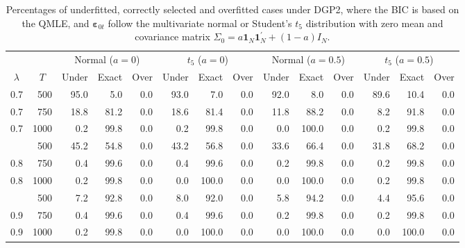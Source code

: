 \begin{table}[htbp]
	\centering
	\caption{\label{tab_BIC} Percentages of underfitted, correctly selected and overfitted cases under DGP2, where the BIC is based on the QMLE, and $\bm \varepsilon_{0t}$ follow the multivariate normal or Student's $t_5$ distribution with zero mean and covariance matrix $\Sigma_0 =   a \bm 1_N \bm 1_N^\prime + (1-a)I_N $. }
		\renewcommand{\arraystretch}{1.1}
	\begin{adjustbox}{width=\textwidth}
		\begin{tabular}{rrrrrrrrrrrrrr}
			\toprule
			&       & \multicolumn{3}{c}{Normal ($a=0$)} & \multicolumn{3}{c}{$t_5$ ($a=0$)} & \multicolumn{3}{c}{Normal ($a=0.5$)} & \multicolumn{3}{c}{$t_5$ ($a=0.5$)} \\
			\cmidrule(lr){3-5} \cmidrule(lr){6-8} \cmidrule(lr){9-11} \cmidrule(lr){12-14}
		\multicolumn{1}{c}{$\lambda$}	&  \multicolumn{1}{c}{$T$}  & \multicolumn{1}{l}{Under} & \multicolumn{1}{l}{Exact} & \multicolumn{1}{l}{Over} & \multicolumn{1}{l}{Under} & \multicolumn{1}{l}{Exact} & \multicolumn{1}{l}{Over} & \multicolumn{1}{l}{Under} & \multicolumn{1}{l}{Exact} & \multicolumn{1}{l}{Over} & \multicolumn{1}{l}{Under} & \multicolumn{1}{l}{Exact} & \multicolumn{1}{l}{Over} \\
			\midrule
0.7 & 500 & 95.0 & 5.0 & 0.0 & 93.0 & 7.0 & 0.0 & 92.0 & 8.0 & 0.0 & 89.6 & 10.4 & 0.0 \\
0.7 & 750 & 18.8 & 81.2 & 0.0 & 18.6 & 81.4 & 0.0 & 11.8 & 88.2 & 0.0 & 8.2 & 91.8 & 0.0 \\
0.7 & 1000 & 0.2 & 99.8 & 0.0 & 0.2 & 99.8 & 0.0 & 0.0 & 100.0 & 0.0 & 0.2 & 99.8 & 0.0 \\
\addlinespace[3pt]
0.8 & 500 & 45.2 & 54.8 & 0.0 & 43.2 & 56.8 & 0.0 & 33.6 & 66.4 & 0.0 & 31.8 & 68.2 & 0.0 \\
0.8 & 750 & 0.4 & 99.6 & 0.0 & 0.4 & 99.6 & 0.0 & 0.2 & 99.8 & 0.0 & 0.2 & 99.8 & 0.0 \\
0.8 & 1000 & 0.2 & 99.8 & 0.0 & 0.0 & 100.0 & 0.0 & 0.0 & 100.0 & 0.0 & 0.2 & 99.8 & 0.0 \\
\addlinespace[3pt]
0.9 & 500 & 7.2 & 92.8 & 0.0 & 8.0 & 92.0 & 0.0 & 5.8 & 94.2 & 0.0 & 4.4 & 95.6 & 0.0 \\
0.9 & 750 & 0.4 & 99.6 & 0.0 & 0.4 & 99.6 & 0.0 & 0.2 & 99.8 & 0.0 & 0.2 & 99.8 & 0.0 \\
0.9 & 1000 & 0.2 & 99.8 & 0.0 & 0.0 & 100.0 & 0.0 & 0.0 & 100.0 & 0.0 & 0.0 & 100.0 & 0.0 \\
\bottomrule
\end{tabular}
\end{adjustbox}
\end{table}
